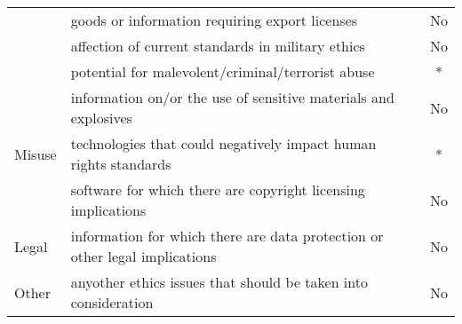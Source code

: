 \begin{table}[hpt]
\begin{adjustbox}{center}
\begin{tabular}{|l||l|c|}
  \cellcolor[HTML]{ECF4FF}                                                                                 & goods or information requiring export licenses                                          & No                                                   \\ \cline{2-3} 
  \rowcolor[HTML]{ECF4FF} 
  \multirow{-4}{*}{\cellcolor[HTML]{ECF4FF}Dual use}                                                       & affection of current standards in military ethics                                       & No                                                   \\ \hline
                                                                                                           & potential for malevolent/criminal/terrorist abuse                                       & *                                                    \\ \cline{2-3} 
                                                                                                           & \cellcolor[HTML]{ECF4FF}information on/or the use of sensitive materials and explosives & \cellcolor[HTML]{ECF4FF}No                           \\ \cline{2-3} 
  \multirow{-3}{*}{Misuse}                                                                                 & technologies that could negatively impact human rights standards                        & *                                                    \\ \hline
  \rowcolor[HTML]{ECF4FF} 
  \cellcolor[HTML]{ECF4FF}                                                                                 & software for which there are copyright licensing implications                           & No                                                   \\ \cline{2-3} 
  \multirow{-2}{*}{\cellcolor[HTML]{ECF4FF}Legal}                                                          & information for which there are data protection or other legal implications             & No                                                   \\ \hline
  Other                                                                                                    & \cellcolor[HTML]{ECF4FF}anyother ethics issues that should be taken into consideration  & \cellcolor[HTML]{ECF4FF}No                           \\ \hline
  \end{tabular}
  \end{adjustbox}
\end{table}